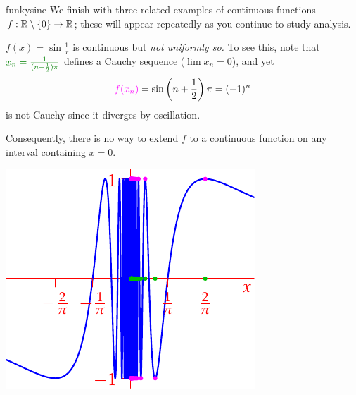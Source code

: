 \begin{examples}{}{funkysine}
	We finish with three related examples of continuous functions $f:\mathbb{R}\setminus\{0\}\to\mathbb{R}$; these will appear repeatedly as you continue to study analysis.
	\begin{enumerate}		
		\begin{minipage}[t]{0.6\linewidth}\vspace{0pt}
			\item $f(x)=\sin\frac 1x$ is continuous but \emph{not uniformly so.} To see this, note that $\textcolor{Green}{x_n=\frac 1{(n+\frac 12)\pi}}$ defines a Cauchy sequence ($\lim x_n=0$), and yet
			\[
				\textcolor{Magenta}{f(x_n)}=\sin\left(n+\frac 12\right)\pi=(-1)^n
			\]
			is not Cauchy since it diverges by oscillation.\par
			Consequently, there is no way to extend $f$ to a continuous function on any interval containing $x=0$.
		\end{minipage}
		\hfill
		\begin{minipage}[t]{0.39\linewidth}\vspace{0pt}
			\flushright\includegraphics[scale=0.95]{unifcontex3}
		\end{minipage}\par
	  

\end{enumerate}
\end{examples}
